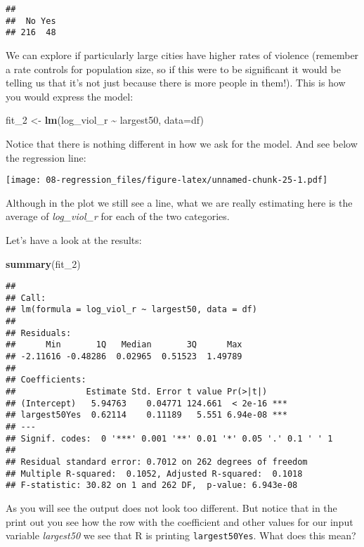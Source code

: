 \documentclass[
]{book}
\newenvironment{Shaded}{\begin{snugshade}}{\end{snugshade}}
\newcommand{\AttributeTok}[1]{\textcolor[rgb]{0.13,0.29,0.53}{#1}}
\newcommand{\FunctionTok}[1]{\textcolor[rgb]{0.13,0.29,0.53}{\textbf{#1}}}
\newcommand{\NormalTok}[1]{#1}
\newcommand{\OtherTok}[1]{\textcolor[rgb]{0.56,0.35,0.01}{#1}}
\newcommand{\SpecialCharTok}[1]{\textcolor[rgb]{0.81,0.36,0.00}{\textbf{#1}}}
\begin{document}
\begin{verbatim}
## 
##  No Yes 
## 216  48
\end{verbatim}

We can explore if particularly large cities have higher rates of violence (remember a rate controls for population size, so if this were to be significant it would be telling us that it's not just because there is more people in them!). This is how you would express the model:

\begin{Shaded}
\begin{Highlighting}[]
\NormalTok{fit\_2 }\OtherTok{\textless{}{-}} \FunctionTok{lm}\NormalTok{(log\_viol\_r }\SpecialCharTok{\textasciitilde{}}\NormalTok{ largest50, }\AttributeTok{data=}\NormalTok{df)}
\end{Highlighting}
\end{Shaded}

Notice that there is nothing different in how we ask for the model. And see below the regression line:

\texttt{[image: 08-regression\_files/figure-latex/unnamed-chunk-25-1.pdf]}

Although in the plot we still see a line, what we are really estimating here is the average of \emph{log\_viol\_r} for each of the two categories.

Let's have a look at the results:

\begin{Shaded}
\begin{Highlighting}[]
\FunctionTok{summary}\NormalTok{(fit\_2)}
\end{Highlighting}
\end{Shaded}

\begin{verbatim}
## 
## Call:
## lm(formula = log_viol_r ~ largest50, data = df)
## 
## Residuals:
##      Min       1Q   Median       3Q      Max 
## -2.11616 -0.48286  0.02965  0.51523  1.49789 
## 
## Coefficients:
##              Estimate Std. Error t value Pr(>|t|)    
## (Intercept)   5.94763    0.04771 124.661  < 2e-16 ***
## largest50Yes  0.62114    0.11189   5.551 6.94e-08 ***
## ---
## Signif. codes:  0 '***' 0.001 '**' 0.01 '*' 0.05 '.' 0.1 ' ' 1
## 
## Residual standard error: 0.7012 on 262 degrees of freedom
## Multiple R-squared:  0.1052, Adjusted R-squared:  0.1018 
## F-statistic: 30.82 on 1 and 262 DF,  p-value: 6.943e-08
\end{verbatim}

As you will see the output does not look too different. But notice that in the print out you see how the row with the coefficient and other values for our input variable \emph{largest50} we see that R is printing \texttt{largest50Yes}. What does this mean?
\end{document}
